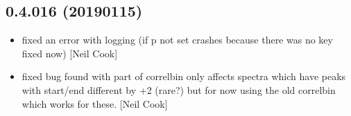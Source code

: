 \documentclass[a4paper,10pt,english]{report}
\begin{document}
\subsection{0.4.016 (2019\sphinxhyphen{}01\sphinxhyphen{}15)}
\label{\detokenize{misc/changelog:id236}}\begin{itemize}
\item {} 
 \sphinxhyphen{} fixed an error with logging (if p not set crashes
because there was no  key \textendash{} fixed now) {[}Neil Cook{]}

\item {} 
 \sphinxhyphen{} fixed bug found with part of correlbin \sphinxhyphen{} only affects
spectra which have peaks with start/end different by +2 (rare?) but
for now using the old correlbin which works for these. {[}Neil Cook{]}

\end{itemize}
\end{document}
